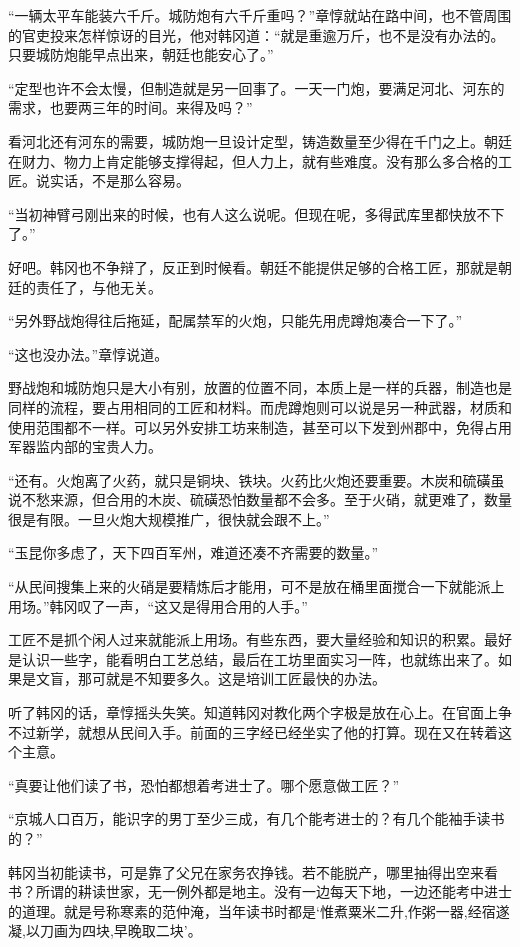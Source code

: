 “一辆太平车能装六千斤。城防炮有六千斤重吗？”章惇就站在路中间，也不管周围的官吏投来怎样惊讶的目光，他对韩冈道：“就是重逾万斤，也不是没有办法的。只要城防炮能早点出来，朝廷也能安心了。”

“定型也许不会太慢，但制造就是另一回事了。一天一门炮，要满足河北、河东的需求，也要两三年的时间。来得及吗？”

看河北还有河东的需要，城防炮一旦设计定型，铸造数量至少得在千门之上。朝廷在财力、物力上肯定能够支撑得起，但人力上，就有些难度。没有那么多合格的工匠。说实话，不是那么容易。

“当初神臂弓刚出来的时候，也有人这么说呢。但现在呢，多得武库里都快放不下了。”

好吧。韩冈也不争辩了，反正到时候看。朝廷不能提供足够的合格工匠，那就是朝廷的责任了，与他无关。

“另外野战炮得往后拖延，配属禁军的火炮，只能先用虎蹲炮凑合一下了。”

“这也没办法。”章惇说道。

野战炮和城防炮只是大小有别，放置的位置不同，本质上是一样的兵器，制造也是同样的流程，要占用相同的工匠和材料。而虎蹲炮则可以说是另一种武器，材质和使用范围都不一样。可以另外安排工坊来制造，甚至可以下发到州郡中，免得占用军器监内部的宝贵人力。

“还有。火炮离了火药，就只是铜块、铁块。火药比火炮还要重要。木炭和硫磺虽说不愁来源，但合用的木炭、硫磺恐怕数量都不会多。至于火硝，就更难了，数量很是有限。一旦火炮大规模推广，很快就会跟不上。”

“玉昆你多虑了，天下四百军州，难道还凑不齐需要的数量。”

“从民间搜集上来的火硝是要精炼后才能用，可不是放在桶里面搅合一下就能派上用场。”韩冈叹了一声，“这又是得用合用的人手。”

工匠不是抓个闲人过来就能派上用场。有些东西，要大量经验和知识的积累。最好是认识一些字，能看明白工艺总结，最后在工坊里面实习一阵，也就练出来了。如果是文盲，那可就是不知要多久。这是培训工匠最快的办法。

听了韩冈的话，章惇摇头失笑。知道韩冈对教化两个字极是放在心上。在官面上争不过新学，就想从民间入手。前面的三字经已经坐实了他的打算。现在又在转着这个主意。

“真要让他们读了书，恐怕都想着考进士了。哪个愿意做工匠？”

“京城人口百万，能识字的男丁至少三成，有几个能考进士的？有几个能袖手读书的？”

韩冈当初能读书，可是靠了父兄在家务农挣钱。若不能脱产，哪里抽得出空来看书？所谓的耕读世家，无一例外都是地主。没有一边每天下地，一边还能考中进士的道理。就是号称寒素的范仲淹，当年读书时都是‘惟煮粟米二升,作粥一器,经宿遂凝,以刀画为四块,早晚取二块’。

